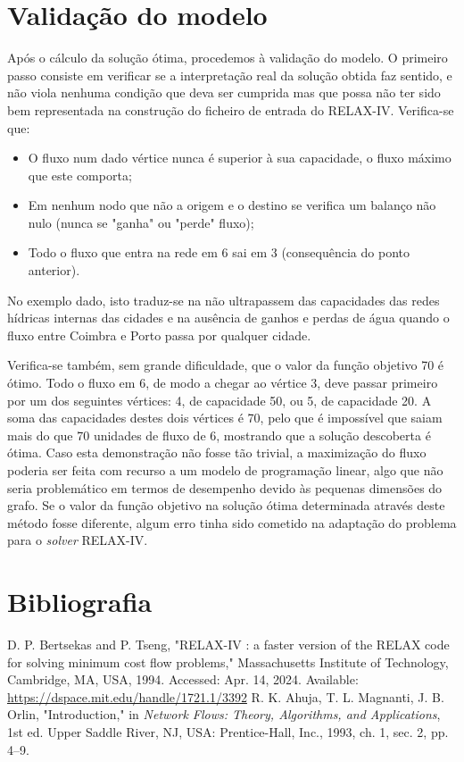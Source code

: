 \documentclass[12pt, a4paper, titlepage]{article}
\begin{document}
\section{Validação do modelo}

Após o cálculo da solução ótima, procedemos à validação do modelo. O primeiro passo consiste em
verificar se a interpretação real da solução obtida faz sentido, e não viola nenhuma condição que
deva ser cumprida mas que possa não ter sido bem representada na construção do ficheiro de entrada
do RELAX-IV. Verifica-se que:

\begin{itemize}
    \item O fluxo num dado vértice nunca é superior à sua capacidade, o fluxo máximo que este
        comporta;
    \item Em nenhum nodo que não a origem e o destino se verifica um balanço não nulo (nunca se
        "ganha"{} ou "perde"{} fluxo);
    \item Todo o fluxo que entra na rede em 6 sai em 3 (consequência do ponto anterior).
\end{itemize}

No exemplo dado, isto traduz-se na não ultrapassem das capacidades das redes hídricas internas das
cidades e na ausência de ganhos e perdas de água quando o fluxo entre Coimbra e Porto passa por
qualquer cidade.

Verifica-se também, sem grande dificuldade, que o valor da função objetivo 70 é ótimo. Todo o fluxo
em 6, de modo a chegar ao vértice 3, deve passar primeiro por um dos seguintes vértices: 4, de
capacidade 50, ou 5, de capacidade 20. A soma das capacidades destes dois vértices é 70, pelo que é
impossível que saiam mais do que 70 unidades de fluxo de 6, mostrando que a solução descoberta é
ótima. Caso esta demonstração não fosse tão trivial, a maximização do fluxo poderia ser feita com
recurso a um modelo de programação linear, algo que não seria problemático em termos de desempenho
devido às pequenas dimensões do grafo. Se o valor da função objetivo na solução ótima determinada
através deste método fosse diferente, algum erro tinha sido cometido na adaptação do problema para o
\emph{solver} RELAX-IV.

\section{Bibliografia}
\def\refname{}
\vspace{-1.5cm}
\begin{thebibliography}{9}
        D. P. Bertsekas and P. Tseng, "RELAX-IV : a faster version of the RELAX code for solving
        minimum cost flow problems,"{} Massachusetts Institute of Technology, Cambridge, MA, USA,
        1994. Accessed: Apr. 14, 2024. Available: \url{https://dspace.mit.edu/handle/1721.1/3392}
        R. K. Ahuja, T. L. Magnanti, J. B. Orlin, "Introduction,"{} in \emph{Network Flows: Theory,
        Algorithms, and Applications}, 1st ed. Upper Saddle River, NJ, USA: Prentice-Hall, Inc.,
        1993, ch. 1, sec. 2, pp. 4--9.
\end{thebibliography}
\end{document}
